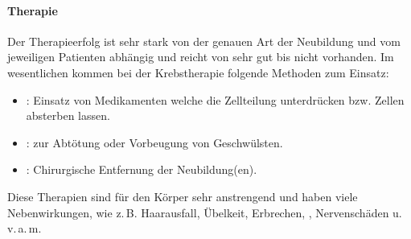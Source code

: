 \paragraph{Therapie}

Der Therapieerfolg ist sehr stark von der genauen Art der
Neubildung und vom jeweiligen Patienten abhängig und reicht
von sehr gut bis nicht vorhanden. 
Im wesentlichen kommen bei der Krebstherapie folgende
Methoden zum Einsatz:
\begin{itemize}
    \item {}: Einsatz von Medikamenten welche
    die Zellteilung unterdrücken bzw. Zellen absterben
    lassen.
    \item {}: zur Abtötung oder Vorbeugung von
    Geschwülsten.
    \item {}: Chirurgische Entfernung der
    Neubildung(en).
\end{itemize}
Diese Therapien sind für den Körper sehr anstrengend und
haben viele Nebenwirkungen, wie z.\,B. Haarausfall, Übelkeit,
Erbrechen, , Nervenschäden
u.\,v.\,a.\,m.

\cite{UlfigHistologie1,GantenTumorerkr98,Uicc3}


\ChapterEnd

